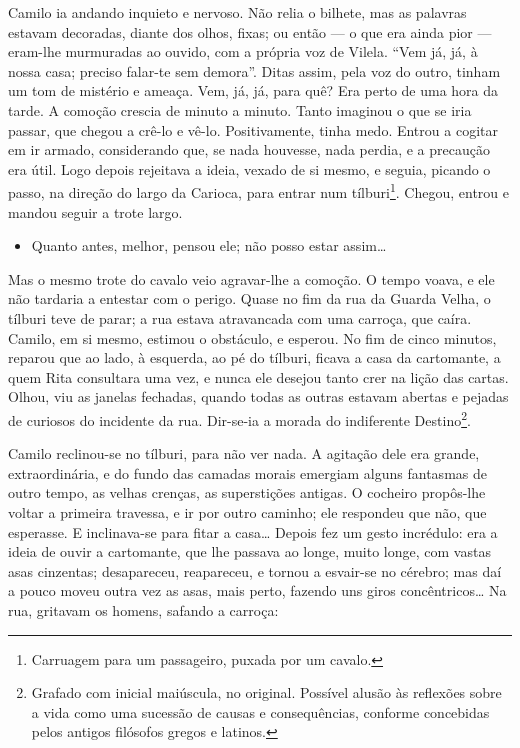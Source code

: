 Camilo ia andando inquieto e nervoso. Não relia o bilhete, mas as
palavras estavam decoradas, diante dos olhos, fixas; ou então --- o que
era ainda pior --- eram-lhe murmuradas ao ouvido, com a própria voz de
Vilela. ``Vem já, já, à nossa casa; preciso falar-te sem demora''. Ditas
assim, pela voz do outro, tinham um tom de mistério e ameaça. Vem, já,
já, para quê? Era perto de uma hora da tarde. A comoção crescia de
minuto a minuto. Tanto imaginou o que se iria passar, que chegou a
crê-lo e vê-lo. Positivamente, tinha medo. Entrou a cogitar em ir
armado, considerando que, se nada houvesse, nada perdia, e a precaução
era útil. Logo depois rejeitava a ideia, vexado de si mesmo, e seguia,
picando o passo, na direção do largo da Carioca, para entrar
num tílburi\footnote{Carruagem para um passageiro, puxada por um cavalo.}.
Chegou, entrou e mandou seguir a trote largo.

\begin{itemize}
\item
  Quanto antes, melhor, pensou ele; não posso estar assim\ldots{}
\end{itemize}

Mas o mesmo trote do cavalo veio agravar-lhe a comoção. O tempo voava, e
ele não tardaria a entestar com o perigo. Quase no fim da rua da Guarda
Velha, o tílburi teve de parar; a rua estava atravancada com uma
carroça, que caíra. Camilo, em si mesmo, estimou o obstáculo, e esperou.
No fim de cinco minutos, reparou que ao lado, à esquerda, ao pé
do tílburi, ficava a casa da cartomante, a quem Rita consultara uma vez,
e nunca ele desejou tanto crer na lição das cartas. Olhou, viu as
janelas fechadas, quando todas as outras estavam abertas e pejadas de
curiosos do incidente da rua. Dir-se-ia a morada do
indiferente Destino\footnote{Grafado com inicial maiúscula, no original.
  Possível alusão às reflexões sobre a vida como uma sucessão de causas
  e consequências, conforme concebidas pelos antigos filósofos gregos e
  latinos.}.

Camilo reclinou-se no tílburi, para não ver nada. A agitação dele era
grande, extraordinária, e do fundo das camadas morais emergiam alguns
fantasmas de outro tempo, as velhas crenças, as superstições antigas. O
cocheiro propôs-lhe voltar a primeira travessa, e ir por outro caminho;
ele respondeu que não, que esperasse. E inclinava-se para fitar a
casa\ldots{} Depois fez um gesto incrédulo: era a ideia de ouvir a
cartomante, que lhe passava ao longe, muito longe, com vastas asas
cinzentas; desapareceu, reapareceu, e tornou a esvair-se no cérebro; mas
daí a pouco moveu outra vez as asas, mais perto, fazendo uns giros
concêntricos\ldots{} Na rua, gritavam os homens, safando a carroça:

